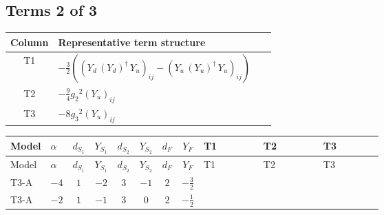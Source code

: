 \documentclass[8pt]{article}
\begin{document}
\begin{landscape}
\subsection*{Terms 2 of 3}
\begin{center}
\begin{tabular}{@{}c >{\raggedright\arraybackslash}p{0.82\linewidth}@{}}
\toprule
Column & Representative term structure \\
\midrule
T1 & \(\displaystyle -\frac{3}{2} (\left({Y_d}\,\left({Y_d}\right)^{\dagger}\,{Y_u}\right)_{ij}-\left({Y_u}\,\left({Y_u}\right)^{\dagger}\,{Y_u}\right)_{ij})\) \\
\midrule
T2 & \(\displaystyle -\frac{9}{4} {g_2}^2 \left({Y_u}\right)_{ij}\) \\
\midrule
T3 & \(\displaystyle -8 {g_3}^2 \left({Y_u}\right)_{ij}\) \\
\midrule
\bottomrule
\end{tabular}
\end{center}
\smallskip
\tiny
\begin{longtable}{@{}llcccccc >{\raggedright\arraybackslash}p{0.21\linewidth} >{\raggedright\arraybackslash}p{0.21\linewidth} >{\raggedright\arraybackslash}p{0.21\linewidth}@{}}
\toprule
Model & $\alpha$ & $d_{S_1}$ & $Y_{S_1}$ & $d_{S_2}$ & $Y_{S_2}$ & $d_F$ & $Y_F$ & T1 & T2 & T3 \\
\midrule
\endfirsthead
\toprule
Model & $\alpha$ & $d_{S_1}$ & $Y_{S_1}$ & $d_{S_2}$ & $Y_{S_2}$ & $d_F$ & $Y_F$ & T1 & T2 & T3 \\
\midrule
\endhead
T3-A & $-4$ & $1$ & $-2$ & $3$ & $-1$ & $2$ & $-\frac{3}{2}$ & \scriptsize\adjustbox{max width=\linewidth}{$\begin{gathered} -\frac{3}{2} (\left({Y_d}\,\left({Y_d}\right)^{\dagger}\,{Y_u}\right)_{ij}-\left({Y_u}\,\left({Y_u}\right)^{\dagger}\,{Y_u}\right)_{ij})\end{gathered}$} & \scriptsize\adjustbox{max width=\linewidth}{$\begin{gathered} -\frac{9}{4} {g_2}^2 \left({Y_u}\right)_{ij}\end{gathered}$} & \scriptsize\adjustbox{max width=\linewidth}{$\begin{gathered} -8 {g_3}^2 \left({Y_u}\right)_{ij}\end{gathered}$} \\
\midrule
T3-A & $-2$ & $1$ & $-1$ & $3$ & $0$ & $2$ & $-\frac{1}{2}$ & \scriptsize\adjustbox{max width=\linewidth}{$\begin{gathered} -\frac{3}{2} (\left({Y_d}\,\left({Y_d}\right)^{\dagger}\,{Y_u}\right)_{ij}-\left({Y_u}\,\left({Y_u}\right)^{\dagger}\,{Y_u}\right)_{ij})\end{gathered}$} & \scriptsize\adjustbox{max width=\linewidth}{$\begin{gathered} -\frac{9}{4} {g_2}^2 \left({Y_u}\right)_{ij}\end{gathered}$} & \scriptsize\adjustbox{max width=\linewidth}{$\begin{gathered} -8 {g_3}^2 \left({Y_u}\right)_{ij}\end{gathered}$} \\

\end{longtable}
\end{landscape}
\end{document}
